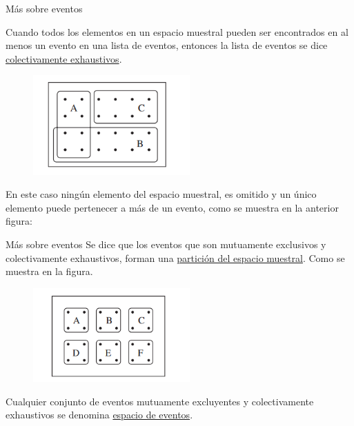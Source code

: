 \documentclass{beamer}
\begin{document}
\begin{frame}{M\'as sobre eventos}
	
Cuando todos los elementos en un espacio muestral pueden ser encontrados en al menos un evento en una lista de eventos, entonces la lista de eventos se dice \underline{colectivamente exhaustivos}. 
	
	\vspace{0.2cm}
	
	\begin{figure}[!htb]
		\centering
		\includegraphics[width=6cm]{p4}
	\end{figure}
\scriptsize{En este caso ning\'un elemento del espacio muestral, es omitido y un \'unico elemento puede pertenecer a m\'as de un evento, como se muestra en la anterior figura:}
\end{frame}
\begin{frame}{M\'as sobre eventos}
Se dice que los eventos que son mutuamente exclusivos y colectivamente exhaustivos, forman una \underline{partici\'on del espacio muestral}. Como se muestra en la figura. 

\vspace{0.2cm}

\begin{figure}[!htb]
	\centering
	\includegraphics[width=6cm]{p5}
\end{figure}

Cualquier conjunto de eventos mutuamente excluyentes y colectivamente exhaustivos se denomina \underline{espacio de eventos}.

\end{frame}
\end{document}
